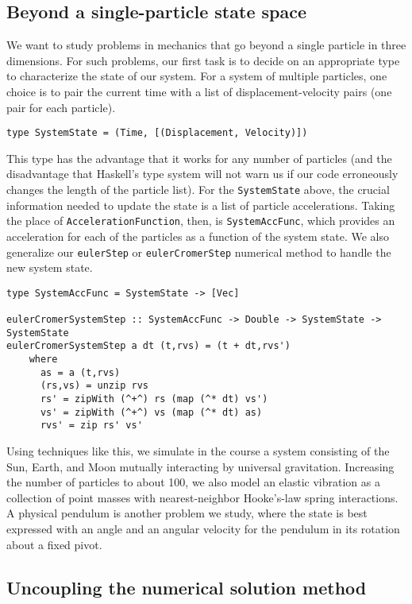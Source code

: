 \documentclass{eptcs}
\begin{document}
\subsection{Beyond a single-particle state space}

We want to study problems in mechanics that go beyond
a single particle in three dimensions.
For such problems, our first task is to decide on an appropriate
type to characterize the state of our system.
For a system of multiple particles, one choice is to pair
the current time with a list of displacement-velocity pairs
(one pair for each particle).
\begin{verbatim}
type SystemState = (Time, [(Displacement, Velocity)])
\end{verbatim}
This type has the advantage that it works for any number of particles
(and the disadvantage that Haskell's type system will not warn us
if our code erroneously changes the length of the particle list).
For the \verb|SystemState| above, the crucial information needed
to update the state is a list of particle accelerations.
Taking the place of \verb|AccelerationFunction|, then, is
\verb|SystemAccFunc|, which provides an acceleration for each of
the particles as a function of the system state.
We also generalize our \verb|eulerStep| or \verb|eulerCromerStep| numerical method
to handle the new system state.
\begin{verbatim}
type SystemAccFunc = SystemState -> [Vec]

eulerCromerSystemStep :: SystemAccFunc -> Double -> SystemState -> SystemState
eulerCromerSystemStep a dt (t,rvs) = (t + dt,rvs')
    where
      as = a (t,rvs)
      (rs,vs) = unzip rvs
      rs' = zipWith (^+^) rs (map (^* dt) vs')
      vs' = zipWith (^+^) vs (map (^* dt) as)
      rvs' = zip rs' vs'
\end{verbatim}

Using techniques like this, we simulate in the course
a system consisting of the Sun, Earth, and Moon mutually interacting
by universal gravitation.
Increasing the number of particles to about 100, we also model
an elastic vibration as a collection of point masses with nearest-neighbor
Hooke's-law spring interactions.\cite{giancoliPSE4p318,goldstein12p1}
A physical pendulum is another problem we study, where the state is best
expressed with an angle and an angular velocity for the pendulum in
its rotation about a fixed pivot.

\subsection{Uncoupling the numerical solution method}
\end{document}
